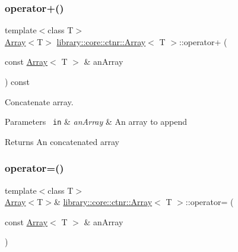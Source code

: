 \subsubsection{\texorpdfstring{operator+()}{operator+()}}
{\footnotesize\ttfamily template$<$class T$>$ \\
\mbox{\hyperlink{classlibrary_1_1core_1_1ctnr_1_1_array}{Array}}$<$T$>$ \mbox{\hyperlink{classlibrary_1_1core_1_1ctnr_1_1_array}{library\+::core\+::ctnr\+::\+Array}}$<$ T $>$\+::operator+ (\begin{DoxyParamCaption}\item[{const \mbox{\hyperlink{classlibrary_1_1core_1_1ctnr_1_1_array}{Array}}$<$ T $>$ \&}]{an\+Array }\end{DoxyParamCaption}) const}



Concatenate array. 


\begin{DoxyCode}{0}
\end{DoxyCode}



\begin{DoxyParams}[1]{Parameters}
\mbox{\texttt{ in}}  & {\em an\+Array} & An array to append \\
\hline
\end{DoxyParams}
\begin{DoxyReturn}{Returns}
An concatenated array 
\end{DoxyReturn}
\mbox{\label{classlibrary_1_1core_1_1ctnr_1_1_array_a30a1be66cd95f9e37c965065f95d2b39}} 
\subsubsection{\texorpdfstring{operator=()}{operator=()}\hspace{0.1cm}{\footnotesize\ttfamily [1/2]}}
{\footnotesize\ttfamily template$<$class T$>$ \\
\mbox{\hyperlink{classlibrary_1_1core_1_1ctnr_1_1_array}{Array}}$<$T$>$\& \mbox{\hyperlink{classlibrary_1_1core_1_1ctnr_1_1_array}{library\+::core\+::ctnr\+::\+Array}}$<$ T $>$\+::operator= (\begin{DoxyParamCaption}\item[{const \mbox{\hyperlink{classlibrary_1_1core_1_1ctnr_1_1_array}{Array}}$<$ T $>$ \&}]{an\+Array }\end{DoxyParamCaption})\hspace{0.3cm}{\ttfamily [default]}}



